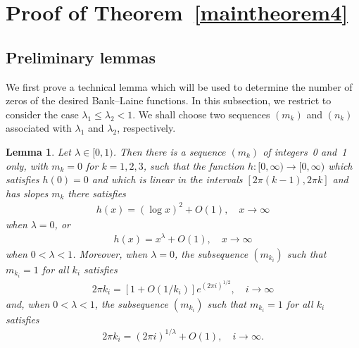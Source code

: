 \documentclass[12pt]{amsart}
\numberwithin{equation}{section}
\newtheorem{lemma}[theorem]{Lemma}
\begin{document}
\section{Proof of Theorem~\ref{maintheorem4}}\label{Proof of maintheorem4} %

\subsection{Preliminary lemmas}\label{Preliminary lemmas} %

We first prove a technical lemma which will be used to determine the number of zeros of the desired Bank--Laine functions. In this subsection, we restrict to consider the case $\lambda_1\leq \lambda_2<1$. We shall choose two sequences $(m_k)$ and $(n_k)$ associated with $\lambda_1$ and $\lambda_2$, respectively.

\begin{lemma}\label{Lemma a}
Let $\lambda\in[0,1)$. Then there is a sequence $(m_k)$ of integers~0 and~1 only, with $m_k=0$ for $k=1,2,3$, such that the function $h:[0,\infty)\to[0,\infty)$ which satisfies $h(0)=0$ and which is linear in the intervals $[2\pi (k-1), 2\pi k]$ and has slopes $m_k$ there satisfies
\begin{equation}\label{recuree1}
\begin{split}
h(x)=(\log x)^2+O(1),  \quad x\to\infty
\end{split}
\end{equation}
when $\lambda=0$, or
\begin{equation}\label{recuree2}
\begin{split}
h(x)=x^{\lambda}+O(1), \quad x\to\infty
\end{split}
\end{equation}
when $0<\lambda<1$. Moreover, when $\lambda=0$, the subsequence $(m_{k_i})$ such that $m_{k_i}=1$ for all $k_i$ satisfies
\begin{equation}\label{recuree3}
\begin{split}
2\pi k_{i}=\left[1+O\left(1/k_i\right)\right]e^{(2\pi i)^{1/2}}, \quad i\to\infty
\end{split}
\end{equation}
and, when $0<\lambda<1$, the subsequence $(m_{k_i})$ such that $m_{k_i}=1$ for all $k_i$ satisfies
\begin{equation}\label{recuree4}
\begin{split}
2\pi k_{i}=(2\pi i)^{1/\lambda}+O(1), \quad i\to\infty.
\end{split}
\end{equation}

\end{lemma}
\end{document}
